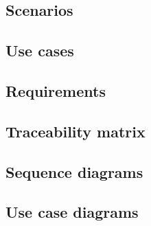 \subsection{Scenarios}


\subsection{Use cases} \label{use_cases}


\subsection{Requirements}


\subsection{Traceability matrix}


\newpage
\subsection{Sequence diagrams}


\subsection{Use case diagrams}

